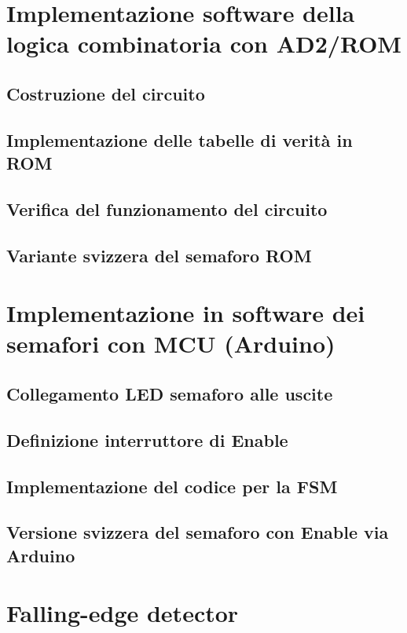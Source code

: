 \documentclass[10pt, a4paper, italian]{article}
\begin{document}
\section{Implementazione software della logica combinatoria con AD2/ROM}
\subsection{Costruzione del circuito}

\subsection{Implementazione delle tabelle di verità in ROM}

\subsection{Verifica del funzionamento del circuito}

\subsection{Variante svizzera del semaforo ROM}

\section{Implementazione in software dei semafori con MCU (Arduino)}
\subsection{Collegamento LED semaforo alle uscite}

\subsection{Definizione interruttore di Enable}

\subsection{Implementazione del codice per la FSM}

\subsection{Versione svizzera del semaforo con Enable via Arduino}

\section{Falling-edge detector}
\end{document}

